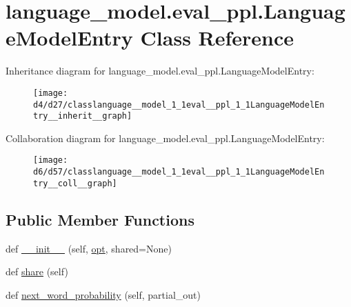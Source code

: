 \hypertarget{classlanguage__model_1_1eval__ppl_1_1LanguageModelEntry}{}\section{language\+\_\+model.\+eval\+\_\+ppl.\+Language\+Model\+Entry Class Reference}
\label{classlanguage__model_1_1eval__ppl_1_1LanguageModelEntry}


Inheritance diagram for language\+\_\+model.\+eval\+\_\+ppl.\+Language\+Model\+Entry\+:\nopagebreak
\begin{figure}[H]
\begin{center}
\leavevmode
\texttt{[image: d4/d27/classlanguage\_\_model\_1\_1eval\_\_ppl\_1\_1LanguageModelEntry\_\_inherit\_\_graph]}
\end{center}
\end{figure}


Collaboration diagram for language\+\_\+model.\+eval\+\_\+ppl.\+Language\+Model\+Entry\+:\nopagebreak
\begin{figure}[H]
\begin{center}
\leavevmode
\texttt{[image: d6/d57/classlanguage\_\_model\_1\_1eval\_\_ppl\_1\_1LanguageModelEntry\_\_coll\_\_graph]}
\end{center}
\end{figure}
\subsection*{Public Member Functions}
\begin{DoxyCompactItemize}
\item 
def \hyperlink{classlanguage__model_1_1eval__ppl_1_1LanguageModelEntry_a295c7e2f6cb59aca07f985d82e4f34c5}{\+\_\+\+\_\+init\+\_\+\+\_\+} (self, \hyperlink{classparlai_1_1agents_1_1language__model_1_1language__model_1_1LanguageModelAgent_af8d8114af65bf817afe01545033d51e6}{opt}, shared=None)
\item 
def \hyperlink{classlanguage__model_1_1eval__ppl_1_1LanguageModelEntry_a3a4b8adc4c891d9de5626b7c15e088a8}{share} (self)
\item 
def \hyperlink{classlanguage__model_1_1eval__ppl_1_1LanguageModelEntry_a16e77aba535b4451ea5071723e271336}{next\+\_\+word\+\_\+probability} (self, partial\+\_\+out)
\end{DoxyCompactItemize}
